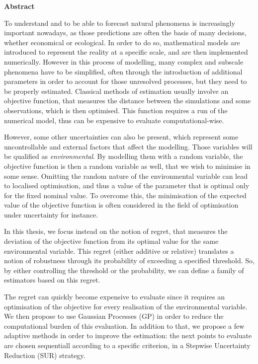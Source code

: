 \vfill

\scriptsize
{}
{}
\begin{center}
  \bf Abstract
\end{center}
\vspace{0.3cm}

To understand and to be able to forecast natural phenomena is
increasingly important nowadays, as those predictions are often the
basis of many decisions, whether economical or ecological. In order to
do so, mathematical models are introduced to represent the reality at
a specific scale, and are then implemented numerically. However in
this process of modelling, many complex and subscale phenomena have to
be simplified, often through the introduction of additional parameters
in order to account for those unresolved processes, but they need to
be properly estimated. Classical methods of estimation usually involve
an objective function, that measures the distance between the
simulations and some observations, which is then optimised. This
function requires a run of the numerical model, thus can be expensive
to evaluate computational-wise.

However, some other uncertainties can also be present, which represent
some uncontrollable and external factors that affect the
modelling. Those variables will be qualified as
\emph{environmental}. By modelling them with a random variable, the
objective function is then a random variable as well, that we wish to
minimise in some sense. Omitting the random nature of the
environmental variable can lead to localised optimisation, and thus a
value of the parameter that is optimal only for the fixed nominal
value.  To overcome this, the minimisation of the expected value of
the objective function is often considered in the field of
optimisation under uncertainty for instance.

In this thesis, we focus instead on the notion of regret, that
measures the deviation of the objective function from its optimal
value for the same environmental variable. This regret (either
additive or relative) translates a notion of robustness through its
probability of exceeding a specified threshold. So, by either
controlling the threshold or the probability, we can define a family
of estimators based on this regret.

The regret can quickly become expensive to evaluate since it requires
an optimisation of the objective for every realisation of the
environmental variable. We then propose to use Gaussian Processes (GP)
in order to reduce the computational burden of this evaluation. In
addition to that, we propose a few adaptive methods in order to
improve the estimation: the next points to evaluate are chosen
sequentiall according to a specific criterion, in a Stepwise
Uncertainty Reduction (SUR) strategy.


